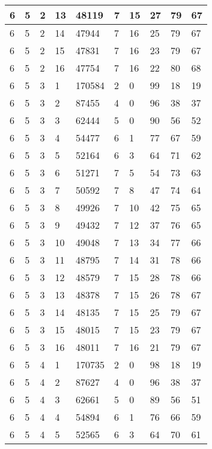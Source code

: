 \begin{table}[!ht]
\begin{tabular}{|l|l|l|l|l|l|l|l|l|l|}
        6 & 5 & 2 & 13 & 48119 & 7 & 15 & 27 & 79 & 67 \\ \hline
        6 & 5 & 2 & 14 & 47944 & 7 & 16 & 25 & 79 & 67 \\ \hline
        6 & 5 & 2 & 15 & 47831 & 7 & 16 & 23 & 79 & 67 \\ \hline
        6 & 5 & 2 & 16 & 47754 & 7 & 16 & 22 & 80 & 68 \\ \hline
        6 & 5 & 3 & 1 & 170584 & 2 & 0 & 99 & 18 & 19 \\ \hline
        6 & 5 & 3 & 2 & 87455 & 4 & 0 & 96 & 38 & 37 \\ \hline
        6 & 5 & 3 & 3 & 62444 & 5 & 0 & 90 & 56 & 52 \\ \hline
        6 & 5 & 3 & 4 & 54477 & 6 & 1 & 77 & 67 & 59 \\ \hline
        6 & 5 & 3 & 5 & 52164 & 6 & 3 & 64 & 71 & 62 \\ \hline
        6 & 5 & 3 & 6 & 51271 & 7 & 5 & 54 & 73 & 63 \\ \hline
        6 & 5 & 3 & 7 & 50592 & 7 & 8 & 47 & 74 & 64 \\ \hline
        6 & 5 & 3 & 8 & 49926 & 7 & 10 & 42 & 75 & 65 \\ \hline
        6 & 5 & 3 & 9 & 49432 & 7 & 12 & 37 & 76 & 65 \\ \hline
        6 & 5 & 3 & 10 & 49048 & 7 & 13 & 34 & 77 & 66 \\ \hline
        6 & 5 & 3 & 11 & 48795 & 7 & 14 & 31 & 78 & 66 \\ \hline
        6 & 5 & 3 & 12 & 48579 & 7 & 15 & 28 & 78 & 66 \\ \hline
        6 & 5 & 3 & 13 & 48378 & 7 & 15 & 26 & 78 & 67 \\ \hline
        6 & 5 & 3 & 14 & 48135 & 7 & 15 & 25 & 79 & 67 \\ \hline
        6 & 5 & 3 & 15 & 48015 & 7 & 15 & 23 & 79 & 67 \\ \hline
        6 & 5 & 3 & 16 & 48011 & 7 & 16 & 21 & 79 & 67 \\ \hline
        6 & 5 & 4 & 1 & 170735 & 2 & 0 & 98 & 18 & 19 \\ \hline
        6 & 5 & 4 & 2 & 87627 & 4 & 0 & 96 & 38 & 37 \\ \hline
        6 & 5 & 4 & 3 & 62661 & 5 & 0 & 89 & 56 & 51 \\ \hline
        6 & 5 & 4 & 4 & 54894 & 6 & 1 & 76 & 66 & 59 \\ \hline
        6 & 5 & 4 & 5 & 52565 & 6 & 3 & 64 & 70 & 61 \\ \hline

\end{tabular}
\end{table}

